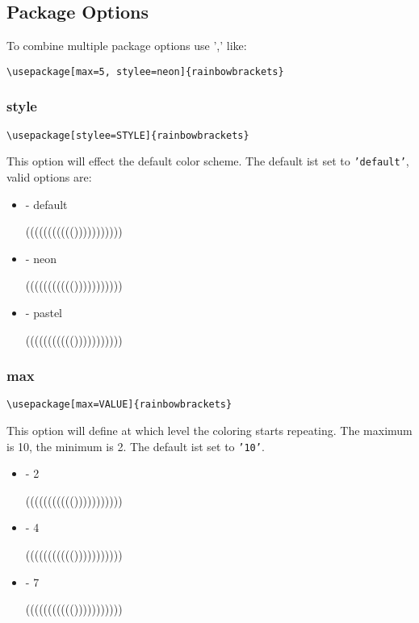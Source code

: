 \documentclass[10pt, a4paper]{article}
\newenvironment{itemizeexample}{
	\begin{itemize}
		\setlength\itemsep{-.5em}
	}
	{
	\end{itemize}
}
\begin{document}
	\subsection{Package Options}
	To combine multiple package options use ',' like:
	\begin{lstlisting}[style=A]
			\usepackage[max=5, stylee=neon]{rainbowbrackets}
	\end{lstlisting}
	\subsubsection{style}
	\begin{lstlisting}[style=A]
			\usepackage[stylee=STYLE]{rainbowbrackets}
	\end{lstlisting}
	This option will effect the default color scheme. The default ist set to \texttt{'default'}, valid options are:
	\begin{itemizeexample}
		\item[-] default \begin{rb}((((((((((()))))))))))\end{rb}
		\item[-] neon \setrbstyleneon\begin{rb}((((((((((()))))))))))\end{rb}
		\item[-] pastel \setrbstylepastel\begin{rb}((((((((((()))))))))))\end{rb}\resetrbstyle
	\end{itemizeexample}
	\subsubsection{max}
	\begin{lstlisting}[style=A]
			\usepackage[max=VALUE]{rainbowbrackets}
	\end{lstlisting}
	This option will define at which level the coloring starts repeating. The maximum is 10, the minimum is 2. The default ist set to \texttt{'10'}.
	\begin{itemizeexample}
		\item[-] 2 \begin{rb}((((((((((()))))))))))\end{rb}
		\item[-] 4 \begin{rb}((((((((((()))))))))))\end{rb}
		\item[-] 7 \begin{rb}((((((((((()))))))))))\end{rb}
	\end{itemizeexample}
\end{document}

